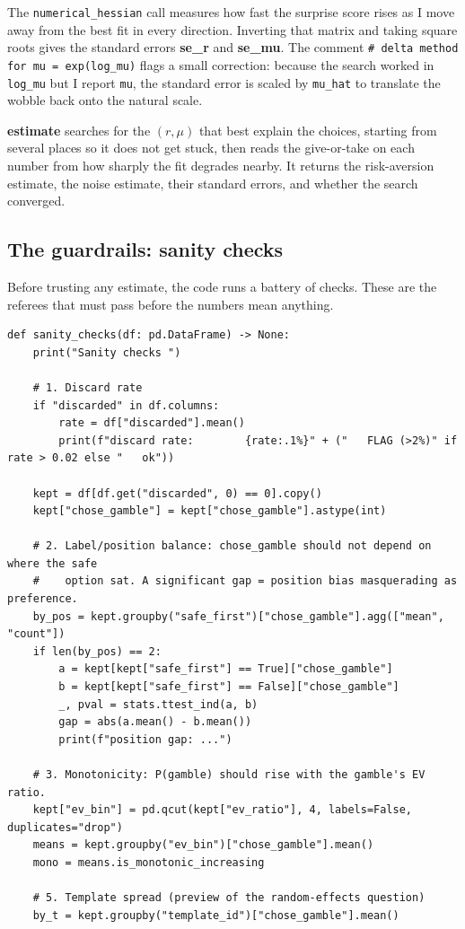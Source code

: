 \documentclass[11pt]{article}
\newcommand{\file}[1]{\textbf{\ttfamily #1}}
\begin{document}
The \verb|numerical_hessian| call measures how fast the surprise score rises as I move away from the
best fit in every direction. Inverting that matrix and taking square roots gives the standard errors
\file{se\_r} and \file{se\_mu}. The comment \verb|# delta method for mu = exp(log_mu)| flags a small
correction: because the search worked in \verb|log_mu| but I report \verb|mu|, the standard error is
scaled by \verb|mu_hat| to translate the wobble back onto the natural scale.

\begin{plainbox}
\file{estimate} searches for the $(r, \mu)$ that best explain the choices, starting from several
places so it does not get stuck, then reads the give-or-take on each number from how sharply the fit
degrades nearby. It returns the risk-aversion estimate, the noise estimate, their standard errors, and
whether the search converged.
\end{plainbox}

\subsection{The guardrails: sanity checks}

Before trusting any estimate, the code runs a battery of checks. These are the referees that must pass
before the numbers mean anything.

\begin{lstlisting}[style=py,firstnumber=99]
def sanity_checks(df: pd.DataFrame) -> None:
    print("Sanity checks ")

    # 1. Discard rate
    if "discarded" in df.columns:
        rate = df["discarded"].mean()
        print(f"discard rate:        {rate:.1%}" + ("   FLAG (>2%)" if rate > 0.02 else "   ok"))

    kept = df[df.get("discarded", 0) == 0].copy()
    kept["chose_gamble"] = kept["chose_gamble"].astype(int)

    # 2. Label/position balance: chose_gamble should not depend on where the safe
    #    option sat. A significant gap = position bias masquerading as preference.
    by_pos = kept.groupby("safe_first")["chose_gamble"].agg(["mean", "count"])
    if len(by_pos) == 2:
        a = kept[kept["safe_first"] == True]["chose_gamble"]
        b = kept[kept["safe_first"] == False]["chose_gamble"]
        _, pval = stats.ttest_ind(a, b)
        gap = abs(a.mean() - b.mean())
        print(f"position gap: ...")

    # 3. Monotonicity: P(gamble) should rise with the gamble's EV ratio.
    kept["ev_bin"] = pd.qcut(kept["ev_ratio"], 4, labels=False, duplicates="drop")
    means = kept.groupby("ev_bin")["chose_gamble"].mean()
    mono = means.is_monotonic_increasing

    # 5. Template spread (preview of the random-effects question)
    by_t = kept.groupby("template_id")["chose_gamble"].mean()
\end{lstlisting}
\end{document}
